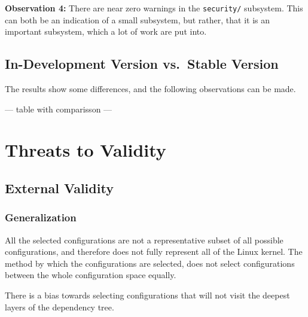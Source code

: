 \documentclass[a4paper,11pt]{report}
\begin{document}
\textbf{Observation 4:}
There are near zero warnings in the \texttt{security/} subsystem. This can both 
be an indication of a small subsystem, but rather, that it is an important 
subsystem, which a lot of work are put into. 




            \section{In-Development Version vs.\ Stable Version}


The results show some differences, and the following observations can be made.

--- table with comparisson ---

            \newpage
            \chapter{Threats to Validity}
            \label{ch:ttv}


            \section{External Validity}
            \label{sec:extval}

            \subsection{Generalization}
            \label{sec:consel}

All the selected configurations are not a representative subset of all possible
configurations, and therefore does not fully represent all of the Linux kernel. 
The method by which the configurations are selected, does not select 
configurations between the whole configuration space equally.

There is a bias towards selecting configurations that will not visit the 
deepest layers of the dependency tree.
\end{document}
